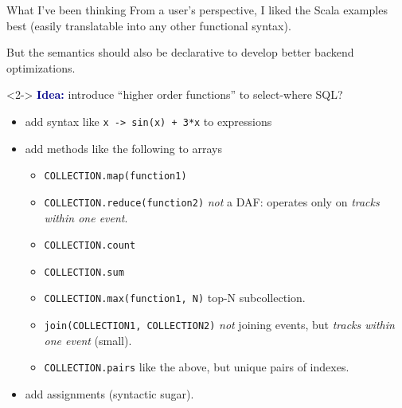 \documentclass{beamer}
\begin{document}
\begin{frame}{What I've been thinking}
\vspace{0.25 cm}
From a user's perspective, I liked the Scala examples best (easily translatable into any other functional syntax).

\vspace{0.25 cm}
But the semantics should also be declarative to develop better backend optimizations.

\vspace{0.25 cm}
\begin{uncoverenv}<2->
\textcolor{darkblue}{\bf Idea:} introduce ``higher order functions'' to select-where SQL?
\begin{itemize}
\item add syntax like {\tt x -> sin(x) + 3*x} to expressions
\item add methods like the following to arrays
\begin{itemize}
\item {\tt \scriptsize COLLECTION.map(function1)}
\item {\tt \scriptsize COLLECTION.reduce(function2)} {\it not} a DAF: operates only on {\it tracks within one event}.
\item {\tt \scriptsize COLLECTION.count}
\item {\tt \scriptsize COLLECTION.sum}
\item {\tt \scriptsize COLLECTION.max(function1, N)} top-N subcollection.
\item {\tt \scriptsize join(COLLECTION1, COLLECTION2)} {\it not} joining events, but {\it tracks within one event} (small).
\item {\tt \scriptsize COLLECTION.pairs} like the above, but unique pairs of indexes.
\end{itemize}
\item add assignments (syntactic sugar).
\end{itemize}
\end{uncoverenv}
\end{frame}
\end{document}
